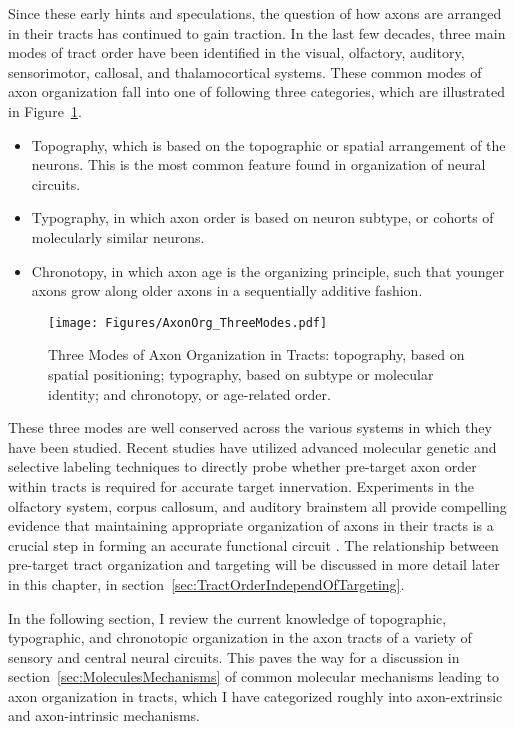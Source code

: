 Since these early hints and speculations, the question of how axons are arranged in their tracts has continued to gain traction.
In the last few decades, three main modes of tract order have been identified in the visual, olfactory, auditory, sensorimotor, callosal, and thalamocortical systems.
These common modes of axon organization fall into one of following three categories, which are illustrated in Figure~\ref{AxonOrg_ThreeModes}.
\begin{itemize}
\item Topography, which is based on the topographic or spatial arrangement of the neurons. This is the most common feature found in organization of neural circuits.
\item Typography, in which axon order is based on neuron subtype, or cohorts of molecularly similar neurons.
\item Chronotopy, in which axon age is the organizing principle, such that younger axons grow along older axons in a sequentially additive fashion.
\end{itemize}
\begin{figure}[hbtp]
    \begin{center}
    \texttt{[image: Figures/AxonOrg\_ThreeModes.pdf]}
    \caption[Three Modes of Axon Organization in Tracts]
	{Three Modes of Axon Organization in Tracts: topography, based on spatial positioning; typography, based on subtype or molecular identity; and chronotopy, or age-related order. 
	\label{AxonOrg_ThreeModes}}
    \end{center}
\end{figure}
These three modes are well conserved across the various systems in which they have been studied.
Recent studies have utilized advanced molecular genetic and selective labeling techniques to directly probe whether pre-target axon order within tracts is required for accurate target innervation.
Experiments in the olfactory system, corpus callosum, and auditory brainstem all provide compelling evidence that maintaining appropriate organization of axons in their tracts is a crucial step in forming an accurate functional circuit \cite{imai2009pre,zhou2013axon,michalski2013robo3}.
The relationship between pre-target tract organization and targeting will be discussed in more detail later in this chapter, in section~\ref{sec:TractOrderIndependOfTargeting}.

In the following section, I review the current knowledge of topographic, typographic, and chronotopic organization in the axon tracts of a variety of sensory and central neural circuits.
This paves the way for a discussion in section~\ref{sec:MoleculesMechanisms} of common molecular mechanisms leading to axon organization in tracts, which I have categorized roughly into axon-extrinsic and axon-intrinsic mechanisms.